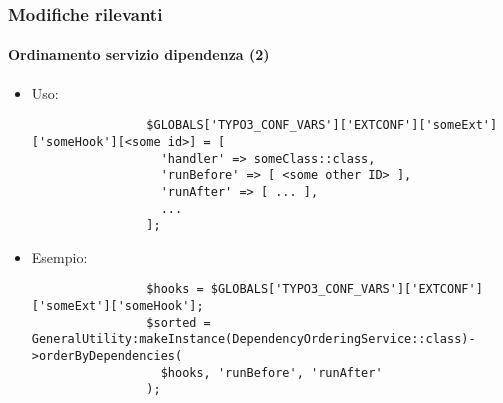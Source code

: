 \begin{frame}[fragile]
	\frametitle{Modifiche rilevanti}
	\framesubtitle{Ordinamento servizio dipendenza (2)}

	\lstset{basicstyle=\tiny\ttfamily}

	\begin{itemize}

		\item Uso:

			\begin{lstlisting}
				$GLOBALS['TYPO3_CONF_VARS']['EXTCONF']['someExt']['someHook'][<some id>] = [
				  'handler' => someClass::class,
				  'runBefore' => [ <some other ID> ],
				  'runAfter' => [ ... ],
				  ...
				];
			\end{lstlisting}

		\item Esempio:

			\begin{lstlisting}
				$hooks = $GLOBALS['TYPO3_CONF_VARS']['EXTCONF']['someExt']['someHook'];
				$sorted = GeneralUtility:makeInstance(DependencyOrderingService::class)->orderByDependencies(
				  $hooks, 'runBefore', 'runAfter'
				);
			\end{lstlisting}

	\end{itemize}

\end{frame}


